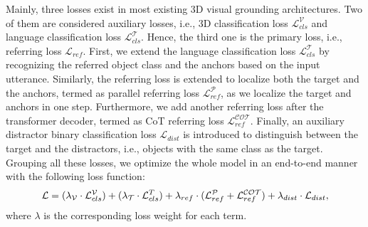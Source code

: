 Mainly, three losses exist in most existing 3D visual grounding architectures.
Two of them are considered auxiliary losses, i.e., 3D classification loss $\mathcal{L}_{cls}^{\mathcal{V}}$ and language classification loss $\mathcal{L}_{cls}^{\mathcal{T}}$.
Hence, the third one is the primary loss, i.e., referring loss $\mathcal{L}_{ref}$.
First, we extend the language classification loss $\mathcal{L}_{cls}^{\mathcal{T}}$ by recognizing the referred object class and the anchors based on the input utterance.
Similarly, the referring loss is extended to localize both the target and the anchors, termed as parallel referring loss $\mathcal{L}_{ref}^{\mathcal{P}}$, as we localize the target and anchors in one step.
Furthermore, we add another referring loss after the transformer decoder, termed as CoT referring loss $\mathcal{L}_{ref}^{\mathcal{COT}}$.
Finally, an auxiliary distractor binary classification loss $\mathcal{L}_{dist}$ is introduced to distinguish between the target and the distractors, i.e., objects with the same class as the target.
Grouping all these losses, we optimize the whole model in an end-to-end manner with the following loss function:
\begingroup
\setlength\abovedisplayskip{6pt}
\setlength\belowdisplayskip{6pt}
\begin{equation}
\label{equ_losses}
\small
    \mathcal{L} = (\lambda_{{\mathcal{V}}} \cdot \mathcal{L}_{cls}^{\mathcal{V}}) + (\lambda_{{\mathcal{T}}} \cdot \mathcal{L}_{cls}^{T}) + \lambda_{ref} \cdot (\mathcal{L}_{ref}^{\mathcal{P}}+\mathcal{L}_{ref}^{\mathcal{COT}}) + \lambda_{dist} \cdot \mathcal{L}_{dist} ,
\end{equation}
\endgroup
where $\lambda$ is the corresponding loss weight for each term.